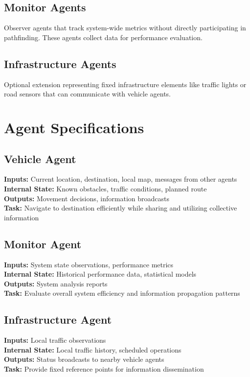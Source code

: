 \documentclass[a4paper, 11pt]{article}
\begin{document}
\subsection{Monitor Agents}
Observer agents that track system-wide metrics without directly participating in pathfinding. These agents collect data for performance evaluation.

\subsection{Infrastructure Agents}
Optional extension representing fixed infrastructure elements like traffic lights or road sensors that can communicate with vehicle agents.

\section{Agent Specifications}
\subsection{Vehicle Agent}
\textbf{Inputs:} Current location, destination, local map, messages from other agents\\
\textbf{Internal State:} Known obstacles, traffic conditions, planned route\\
\textbf{Outputs:} Movement decisions, information broadcasts\\
\textbf{Task:} Navigate to destination efficiently while sharing and utilizing collective information

\subsection{Monitor Agent}
\textbf{Inputs:} System state observations, performance metrics\\
\textbf{Internal State:} Historical performance data, statistical models\\
\textbf{Outputs:} System analysis reports\\
\textbf{Task:} Evaluate overall system efficiency and information propagation patterns

\subsection{Infrastructure Agent}
\textbf{Inputs:} Local traffic observations\\
\textbf{Internal State:} Local traffic history, scheduled operations\\
\textbf{Outputs:} Status broadcasts to nearby vehicle agents\\
\textbf{Task:} Provide fixed reference points for information dissemination
\end{document}
